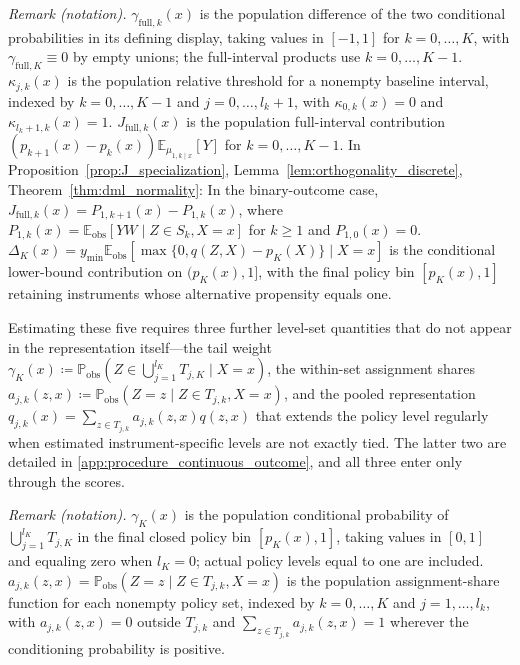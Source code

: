 \noindent\textit{Remark (notation).} $\gamma_{\mathrm{full},k}(x)$ is the population difference of the two conditional probabilities in its defining display, taking values in $[-1,1]$ for $k=0,\ldots,K$, with $\gamma_{\mathrm{full},K}\equiv0$ by empty unions; the full-interval products use $k=0,\ldots,K-1$. $\kappa_{j,k}(x)$ is the population relative threshold for a nonempty baseline interval, indexed by $k=0,\ldots,K-1$ and $j=0,\ldots,l_k+1$, with $\kappa_{0,k}(x)=0$ and $\kappa_{l_k+1,k}(x)=1$. $J_{\text{full},k}(x)$ is the population full-interval contribution $(p_{k+1}(x)-p_k(x))\mathbb E_{\mu_{1,k\mid x}}[Y]$ for $k=0,\ldots,K-1$. In Proposition~\ref{prop:J_specialization}, Lemma~\ref{lem:orthogonality_discrete}, Theorem~\ref{thm:dml_normality}: In the binary-outcome case, $J_{\text{full},k}(x)=P_{1,k+1}(x)-P_{1,k}(x)$, where $P_{1,k}(x)=\mathbb E_{\text{obs}}[YW\mid Z\in S_k,X=x]$ for $k\geqslant1$ and $P_{1,0}(x)=0$. $\Delta_K(x)=y_{\min}\mathbb E_{\text{obs}}[\max\{0,q(Z,X)-p_K(X)\}\mid X=x]$ is the conditional lower-bound contribution on $(p_K(x),1]$, with the final policy bin $[p_K(x),1]$ retaining instruments whose alternative propensity equals one.


Estimating these five requires three further level-set quantities that do not appear in the representation itself---the tail weight $\gamma_K(x)\coloneqq\mathbb{P}_{\text{obs}}(Z\in\bigcup_{j=1}^{l_K}T_{j,K}\mid X=x)$, the within-set assignment shares $a_{j,k}(z,x)\coloneqq\mathbb{P}_{\text{obs}}(Z=z\mid Z\in T_{j,k},X=x)$, and the pooled representation $q_{j,k}(x)=\sum_{z\in T_{j,k}}a_{j,k}(z,x)q(z,x)$ that extends the policy level regularly when estimated instrument-specific levels are not exactly tied. The latter two are detailed in \cref{app:procedure_continuous_outcome}, and all three enter only through the scores.

\noindent\textit{Remark (notation).} $\gamma_K(x)$ is the population conditional probability of $\bigcup_{j=1}^{l_K}T_{j,K}$ in the final closed policy bin $[p_K(x),1]$, taking values in $[0,1]$ and equaling zero when $l_K=0$; actual policy levels equal to one are included. $a_{j,k}(z,x)=\mathbb P_{\mathrm{obs}}(Z=z\mid Z\in T_{j,k},X=x)$ is the population assignment-share function for each nonempty policy set, indexed by $k=0,\ldots,K$ and $j=1,\ldots,l_k$, with $a_{j,k}(z,x)=0$ outside $T_{j,k}$ and $\sum_{z\in T_{j,k}}a_{j,k}(z,x)=1$ wherever the conditioning probability is positive.


